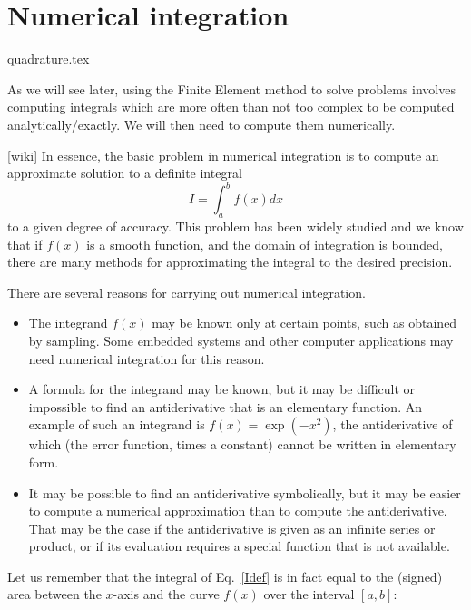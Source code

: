 \chapter{Numerical integration} \label{sec:quadrature}

\begin{flushright} {\tiny {\color{gray} quadrature.tex}} \end{flushright}

As we will see later, using the Finite Element method to solve problems involves 
computing integrals which are more often than not too complex to be computed 
analytically/exactly. We will then need to compute them numerically.

[wiki] In essence, 
the basic problem in numerical integration is to compute an approximate solution to a definite integral
\begin{equation}
I=\int_a^b f(x) dx
\label{Idef}
\end{equation}
to a given degree of accuracy.
This problem has been widely studied and we know that 
if $f(x)$ is a smooth function, and the domain of integration is bounded, 
there are many methods for approximating the integral to the desired precision.

There are several reasons for carrying out numerical integration.
\begin{itemize}
\item The integrand $f(x)$ may be known only at certain points, such as obtained by sampling. 
Some embedded systems and other computer applications may need numerical integration for this reason.
\item A formula for the integrand may be known, but it may be difficult or impossible to 
find an antiderivative that is an elementary function. An example of such an integrand 
is $f(x)=\exp(-x^2)$, the antiderivative of which (the error function, times a constant) 
cannot be written in elementary form.
\item It may be possible to find an antiderivative symbolically, but it may be 
easier to compute a numerical approximation than to compute the antiderivative. That may be the 
case if the antiderivative is given as an infinite series or product, or if its evaluation 
requires a special function that is not available.
\end{itemize}

Let us remember that the integral of Eq.~\eqref{Idef} is in fact equal to the (signed) area 
between the $x$-axis and the curve $f(x)$ over the interval $[a,b]$:

